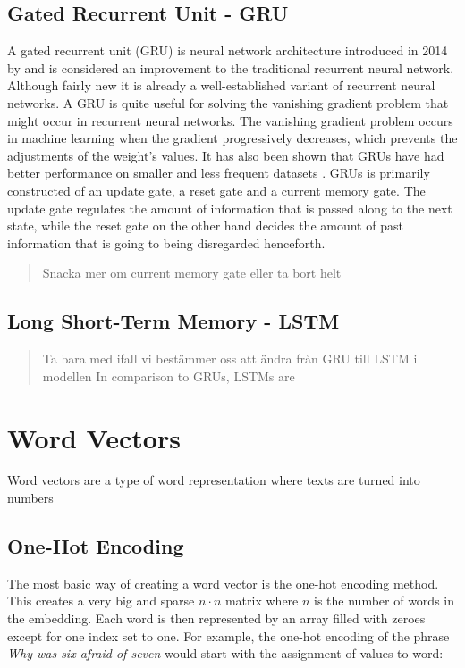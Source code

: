 \documentclass[nofilelist]{cslthse-msc}
\begin{document}
\subsection{Gated Recurrent Unit - GRU}
A gated recurrent unit (GRU) is neural network architecture introduced in 2014 by \citet{cho2014learning} and is considered an improvement to the traditional recurrent neural network. Although fairly new it is already a well-established variant of recurrent neural networks. A GRU is quite useful for solving the vanishing gradient problem \citep{hochreiter1998} that might occur in recurrent neural networks. The vanishing gradient problem occurs in machine learning when the gradient progressively decreases, which prevents the adjustments of the weight's values. It has also been shown that GRUs have had better performance on smaller and less frequent datasets \citep{Gruber2020AreGC}.
GRUs is primarily constructed of an update gate, a reset gate and a current memory gate. The update gate regulates the amount of information that is passed along to the next state, while the reset gate on the other hand decides the amount of past information that is going to being disregarded henceforth. 

\begin{quote}
Snacka mer om current memory gate eller ta bort helt
\end{quote}



\subsection{Long Short-Term Memory - LSTM}

\begin{quote}
    Ta bara med ifall vi bestämmer oss att ändra från GRU till LSTM i modellen
    In comparison to GRUs, LSTMs are   

\end{quote}









\section{Word Vectors}
Word vectors are a type of word representation where texts are turned into numbers
\subsection{One-Hot Encoding}
The most basic way of creating a word vector is the one-hot encoding method. This creates a very big and sparse $n \cdot n$ matrix where $n$ is the number of words in the embedding. Each word is then represented by an array filled with zeroes except for one index set to one. For example, the one-hot encoding of the phrase \textit{Why was six afraid of seven} would start with the assignment of values to word:
\end{document}
